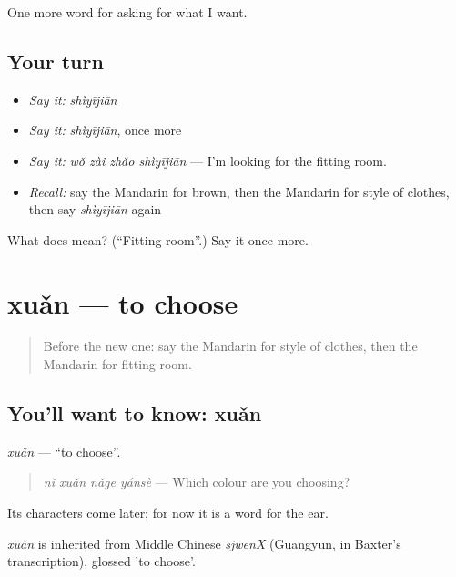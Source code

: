 \begin{grammarlens}[title={What you've built}]
One more word for asking for what I want.
\end{grammarlens}

\subsection*{Your turn}
\begin{itemize}
\raggedright
  \item \emph{Say it:} \emph{shìyījiān}
  \item \emph{Say it:} \emph{shìyījiān}, once more
  \item \emph{Say it:} \emph{wǒ zài zhǎo shìyījiān} — I'm looking for the fitting room.
  \item \emph{Recall:} say the Mandarin for brown, then the Mandarin for style of clothes, then say \emph{shìyījiān} again
\end{itemize}

\begin{tcolorbox}[breakable,colback=teal!4,colframe=teal!35!black,title={Before you move on}]
What does  mean? (\textquotedblleft{}Fitting room\textquotedblright{}.) Say it once more.
\end{tcolorbox}
\section[xuǎn]{xuǎn — to choose}

\label{lesson:ZH-C210-xuan}



\begin{quote}
Before the new one: say the Mandarin for style of clothes, then the Mandarin for fitting room.
\end{quote}

\subsection*{You'll want to know: xuǎn}
\emph{xuǎn} — \textquotedblleft{}to choose\textquotedblright{}.

\begin{quote}
\emph{nǐ xuǎn nǎge yánsè} — Which colour are you choosing?
\end{quote}

Its characters come later; for now it is a word for the ear.

\begin{cousinweb}
\emph{xuǎn} is inherited from Middle Chinese \emph{sjwenX} (Guangyun, in Baxter's transcription), glossed 'to choose'.
\end{cousinweb}

